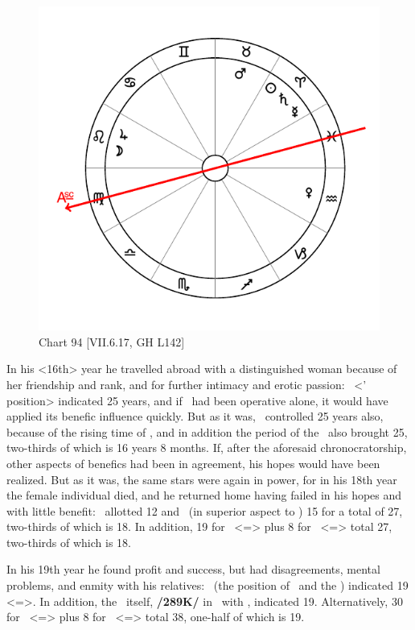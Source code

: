 \begin{figure}
\centering
\vspace{-20pt}
\includegraphics[width=.68\textwidth]{charts/7_6_17}
\caption{Chart 94 [VII.6.17, GH L142] }
\label{fig:chart94}
\end{figure} 

In his <16th> year he travelled abroad with a distinguished
woman because of her friendship and rank, and for further intimacy and erotic passion: \Aquarius\, <\Venus’ position> indicated 25 years, and if \Venus\, had been operative alone, it would have applied its benefic influence quickly. But as it was, \Mars\, controlled 25 years also, because of the rising time of \Taurus, and in addition the period of the \Moon\, also brought 25, two-thirds of which is 16 years 8 months. If, after the aforesaid chronocratorship, other aspects of benefics had been in agreement, his hopes would have been realized. But as it was, the same stars were again in power, for in his 18th year the female individual died,
and he returned home having failed in his hopes and with little benefit: \Jupiter\, allotted 12 and \Mars\, (in superior aspect to \Jupiter) 15 for a total of 27, two-thirds of which is 18. In addition, 19 for \Leo\, <=\Sun> plus 8 for \Taurus\, <=\Venus> total 27, two-thirds of which is 18.

In his 19th year he found profit and success, but had disagreements, mental problems, and enmity with his relatives: \Leo\, (the position of \Jupiter\, and the \Moon) indicated 19 <=\Sun>. In addition, the \Sun\, itself, \textbf{/289K/} in \Aries\, with \Saturn, indicated 19. Alternatively, 30 for \Aquarius\, <=\Saturn> plus 8 for \Taurus\,
<=\Venus> total 38, one-half of which is 19. 

